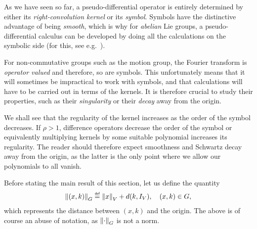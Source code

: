 As we have seen so far,
a pseudo-differential operator is entirely determined by either its \emph{right-convolution kernel} or its \emph{symbol}.
Symbols have the distinctive advantage of being \emph{smooth},
which is why for \emph{abelian} Lie groups,
a pseudo-differential calculus can be developed by doing all the calculations on the symbolic side
(for this, see e.g.\ \cite{RuzhanskyTurunen10}).

For non-commutative groups such as the motion group,
the Fourier transform is \emph{operator valued} and therefore, so are symbols.
This unfortunately means that it will sometimes be impractical to work with symbols,
and that calculations will have to be carried out in terms of the kernels.
It is therefore crucial to study their properties,
such as their \emph{singularity} or their \emph{decay} away from the origin.

We shall see that the regularity of the kernel increases
as the order of the symbol decreases.
If $\rho > 1$, difference operators decrease the order of the symbol
or equivalently multiplying kernels by some suitable polynomial increases its regularity.
The reader should therefore expect smoothness and Schwartz decay away from the origin,
as the latter is the only point where we allow our polynomials to all vanish.

Before stating the main result of this section,
let us define the quantity
\begin{align*}
    \norm [\Group] {(x, k)} \defeq \norm {x} + d(k, \Id{\VectorSpace}), \quad (x, k) \in \Group,
\end{align*}
which represents the distance between $(x, k)$ and the origin.
The above is of course an abuse of notation, as $\norm [\Group] \dummy$ is not a norm.

